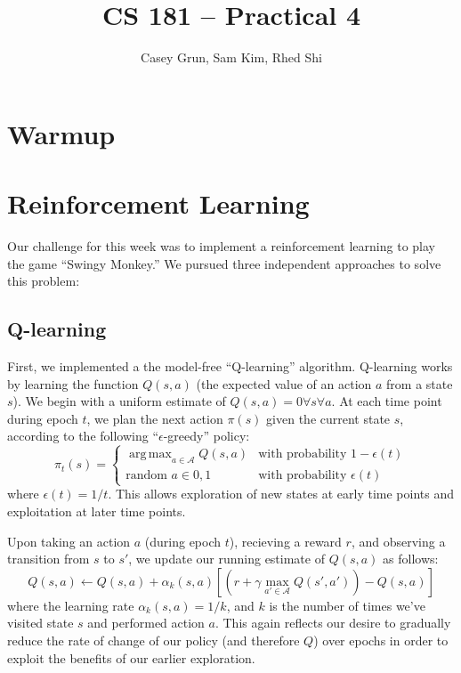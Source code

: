 \documentclass[11pt]{amsart}
\title{CS 181 -- Practical 4}
\author{Casey Grun, Sam Kim, Rhed Shi}
\DeclareMathOperator*{\argmax}{arg\,max}
\begin{document}
\maketitle

\section{Warmup}

\section{Reinforcement Learning}

Our challenge for this week was to implement a reinforcement learning to play
the game ``Swingy Monkey.'' We pursued three independent approaches to solve this 
problem:

\subsection{Q-learning}

First, we implemented a the model-free ``Q-learning'' algorithm. Q-learning works
by learning the function $Q(s,a)$ (the expected value of an action $a$ from a 
state $s$). We begin with a uniform estimate of $Q(s,a) = 0 \forall s \forall a$.
At each time point during epoch $t$, we plan the next action $\pi(s)$ given the 
current state $s$, according to the following ``$\epsilon$-greedy'' policy:
$$\pi_t(s) = \begin{cases} 
\argmax_{a \in \mathcal{A}} Q(s,a) & \text{with probability } 1-\epsilon(t) \\
\text{random } a \in {0,1}         & \text{with probability } \epsilon(t) 
\end{cases}$$
where $\epsilon(t) = 1/t$. This allows exploration of new states at early time 
points and exploitation at later time points.

Upon taking an action $a$ (during epoch $t$), recieving a reward $r$, and observing a transition from $s$
to $s'$, we update our running estimate of $Q(s,a)$ as follows:
$$Q(s,a) \gets Q(s,a) + \alpha_k(s,a) \left[ (r + \gamma \max_{a' \in \mathcal{A}} Q(s', a')) - Q(s,a) \right]$$
where the learning rate $\alpha_k(s,a) = 1/k$, and $k$ is the number of times we've visited state $s$ and performed
action $a$. This again reflects our desire to gradually reduce the rate of change of our 
policy (and therefore $Q$) over epochs in order to exploit the benefits of our earlier exploration.
\end{document}
